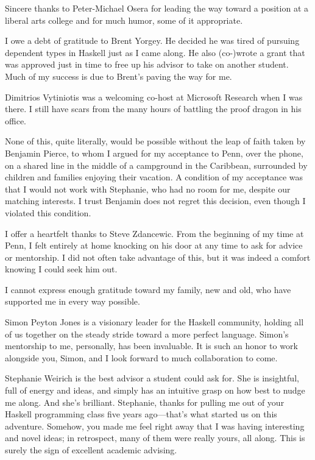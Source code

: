 Sincere thanks to Peter-Michael Osera for leading the way toward
a position at a liberal arts college and for much humor, some of
it appropriate.

I owe a debt of gratitude to Brent Yorgey. He decided he was tired
of pursuing dependent types in Haskell just as I came along. He also
(co-)wrote a grant that was approved just in time to free up his
advisor to take on another student. Much of my success is due to
Brent's paving the way for me.

Dimitrios Vytiniotis was a welcoming co-host at Microsoft Research
when I was there. I still have scars from the many hours of battling the
proof dragon in his office.

None of this, quite literally, would be possible without the leap
of faith taken by Benjamin Pierce, to whom I argued for my acceptance
to Penn, over the phone, on a shared line in the middle of a campground
in the Caribbean, surrounded by children and families enjoying
their vacation. A condition of my acceptance was that I would not work
with Stephanie, who had no room for me, despite our matching interests.
I trust Benjamin does not regret this decision, even though I violated
this condition.

I offer a heartfelt thanks to Steve Zdancewic. From the beginning of my
time at Penn, I felt entirely at home knocking on his door at any
time to ask for advice or mentorship. I did not often take advantage of this,
but it was indeed a comfort knowing I could seek him out.

I cannot express enough gratitude toward my family, new and old,
who have supported me in
every way possible.

Simon Peyton Jones is a visionary leader for the Haskell community,
holding all of us together on the steady stride toward a more perfect
language. Simon's mentorship to me, personally, has been invaluable.
It is such an honor to work alongside you, Simon, and I look
forward to much collaboration to come.

Stephanie Weirich is the best advisor a student could ask for. She is
insightful, full of energy and ideas, and simply has an intuitive
grasp on how best to nudge me along. And she's brilliant. Stephanie,
thanks for pulling me out of your Haskell programming class five years
ago---that's what started us on this adventure. Somehow, you made me
feel right away that I was having interesting and novel ideas; in
retrospect, many of them were really yours, all along. This is
surely the sign of excellent academic advising.

